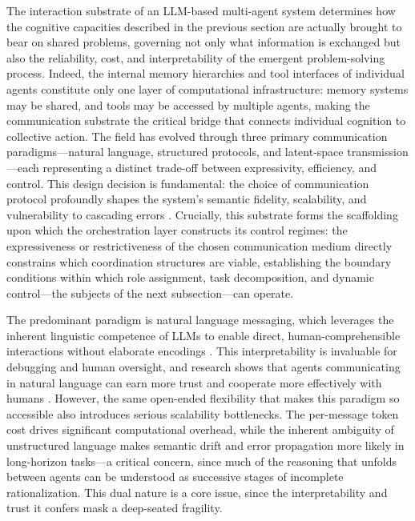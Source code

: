 \documentclass[11pt,a4paper]{article}
\begin{document}
The interaction substrate of an LLM-based multi-agent system determines how the cognitive capacities described in the previous section are actually brought to bear on shared problems, governing not only what information is exchanged but also the reliability, cost, and interpretability of the emergent problem-solving process. Indeed, the internal memory hierarchies and tool interfaces of individual agents constitute only one layer of computational infrastructure: memory systems may be shared, and tools may be accessed by multiple agents, making the communication substrate the critical bridge that connects individual cognition to collective action. The field has evolved through three primary communication paradigms---natural language, structured protocols, and latent-space transmission---each representing a distinct trade-off between expressivity, efficiency, and control. This design decision is fundamental: the choice of communication protocol profoundly shapes the system's semantic fidelity, scalability, and vulnerability to cascading errors \cite{arxiv:2504.16736v3}. Crucially, this substrate forms the scaffolding upon which the orchestration layer constructs its control regimes: the expressiveness or restrictiveness of the chosen communication medium directly constrains which coordination structures are viable, establishing the boundary conditions within which role assignment, task decomposition, and dynamic control---the subjects of the next subsection---can operate.

The predominant paradigm is natural language messaging, which leverages the inherent linguistic competence of LLMs to enable direct, human-comprehensible interactions without elaborate encodings \cite{arxiv:2307.02485v2}. This interpretability is invaluable for debugging and human oversight, and research shows that agents communicating in natural language can earn more trust and cooperate more effectively with humans \cite{arxiv:2307.02485v2}. However, the same open-ended flexibility that makes this paradigm so accessible also introduces serious scalability bottlenecks. The per-message token cost drives significant computational overhead, while the inherent ambiguity of unstructured language makes semantic drift and error propagation more likely in long-horizon tasks---a critical concern, since much of the reasoning that unfolds between agents can be understood as successive stages of incomplete rationalization. This dual nature is a core issue, since the interpretability and trust it confers mask a deep-seated fragility.
\end{document}
